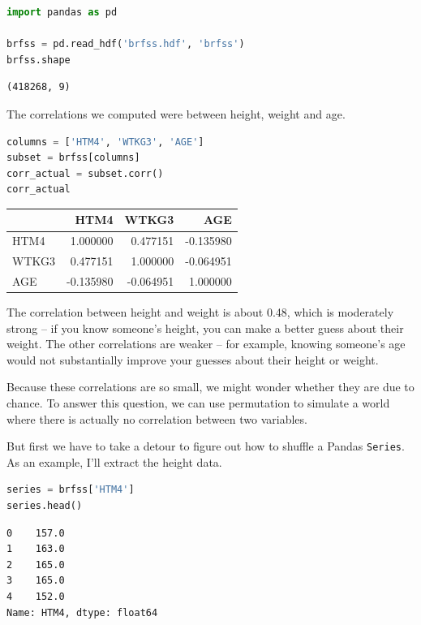 \begin{lstlisting}[language=Python,style=source]
import pandas as pd

brfss = pd.read_hdf('brfss.hdf', 'brfss')
brfss.shape
\end{lstlisting}

\begin{lstlisting}[style=output]
(418268, 9)
\end{lstlisting}

The correlations we computed were between height, weight and age.

\begin{lstlisting}[language=Python,style=source]
columns = ['HTM4', 'WTKG3', 'AGE']
subset = brfss[columns]
corr_actual = subset.corr()
corr_actual
\end{lstlisting}

\begin{tabular}{lrrr}
\midrule
 & HTM4 & WTKG3 & AGE \\
\midrule
HTM4 & 1.000000 & 0.477151 & -0.135980 \\
WTKG3 & 0.477151 & 1.000000 & -0.064951 \\
AGE & -0.135980 & -0.064951 & 1.000000 \\
\midrule
\end{tabular}

The correlation between height and weight is about 0.48, which is
moderately strong -- if you know someone's height, you can make a better
guess about their weight. The other correlations are weaker -- for
example, knowing someone's age would not substantially improve your
guesses about their height or weight.

Because these correlations are so small, we might wonder whether they
are due to chance. To answer this question, we can use permutation to
simulate a world where there is actually no correlation between two
variables.

But first we have to take a detour to figure out how to shuffle a Pandas
\passthrough{\lstinline!Series!}. As an example, I'll extract the height
data.

\begin{lstlisting}[language=Python,style=source]
series = brfss['HTM4']
series.head()
\end{lstlisting}

\begin{lstlisting}[style=output]
0    157.0
1    163.0
2    165.0
3    165.0
4    152.0
Name: HTM4, dtype: float64
\end{lstlisting}

